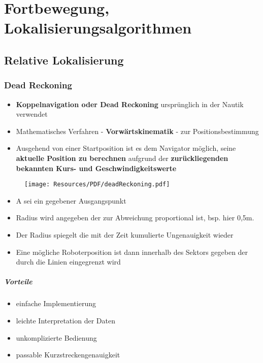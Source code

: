 \chapter{Fortbewegung, Lokalisierungsalgorithmen}
\section{Relative Lokalisierung}
\subsection{Dead Reckoning}
\begin{itemize}
	\item \textbf{Koppelnavigation oder Dead Reckoning} ursprünglich in der Nautik verwendet
	\item Mathematisches Verfahren - \textbf{Vorwärtskinematik} - zur Positionsbestimmung
	\item Ausgehend von einer Startposition ist es dem Navigator möglich, seine \textbf{aktuelle Position zu berechnen} aufgrund der \textbf{zurückliegenden bekannten Kurs- und Geschwindigkeitswerte}
\end{itemize}
\begin{figure}[H]
	\begin{center}
		\texttt{[image: Resources/PDF/deadReckoning.pdf]}
		\caption{}
		\label{fig:PDF/deadReckoning.pdf}
	\end{center}
\end{figure}
\begin{itemize}
	\item A sei ein gegebener Ausgangspunkt
	\item Radius wird angegeben der zur Abweichung proportional ist, bsp. hier 0,5m.
	\item Der Radius spiegelt die mit der Zeit kumulierte Ungenauigkeit wieder
	\item Eine mögliche Roboterposition ist dann innerhalb des Sektors gegeben der durch die Linien eingegrenzt wird
\end{itemize}
\paragraph{Vorteile}
\begin{itemize}
	\item einfache Implementierung
	\item leichte Interpretation der Daten
	\item unkomplizierte Bedienung
	\item passable Kurzstreckengenauigkeit
\end{itemize}
